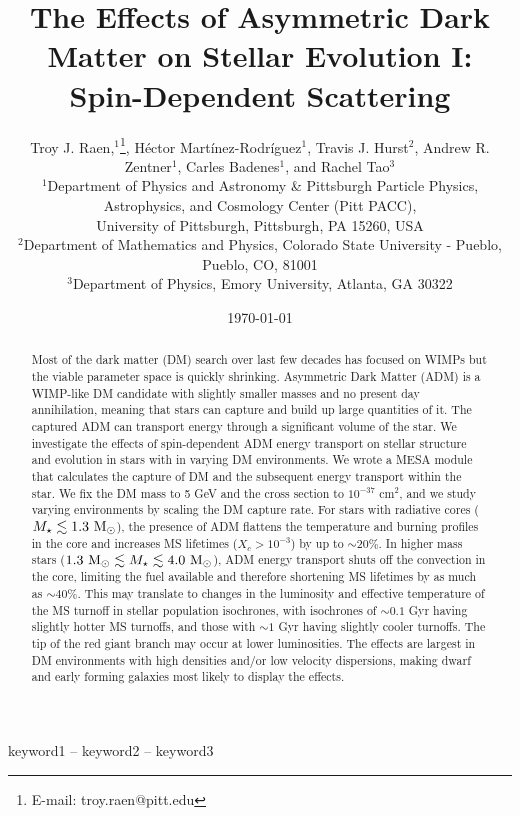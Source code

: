 \documentclass[useAMS,usenatbib]{mnras}
\title[Asymmetric Dark Matter in Stars]{The Effects of Asymmetric Dark Matter on Stellar Evolution I: Spin-Dependent Scattering}
\author[T.J. Raen et al.]{%
Troy J. Raen,$^{1}$\thanks{E-mail: troy.raen@pitt.edu},
Héctor Martínez-Rodríguez$^{1}$, 
Travis J. Hurst$^{2}$,
Andrew R. Zentner$^{1}$,\newauthor
Carles Badenes$^{1}$,
and Rachel Tao$^{3}$
\vspace*{12pt}
\\
$^{1}$Department of Physics and Astronomy \& Pittsburgh Particle Physics, Astrophysics, and Cosmology Center (Pitt PACC),\\ University of Pittsburgh, Pittsburgh, PA 15260, USA\\
$^{2}$Department of Mathematics and Physics, Colorado State University - Pueblo, Pueblo, CO, 81001 \\%
$^{3}$Department of Physics, Emory University, Atlanta, GA 30322
}
\date{\today}
\begin{document}
\label{firstpage}
\pagerange{\pageref{firstpage}--\pageref{lastpage}}
\maketitle



\begin{abstract}
Most of the dark matter (DM) search over last few decades has focused on WIMPs but the viable parameter space is quickly shrinking. Asymmetric Dark Matter (ADM) is a WIMP-like DM candidate with slightly smaller masses and no present day annihilation, meaning that stars can capture and build up large quantities of it. The captured ADM can transport energy through a significant volume of the star. We investigate the effects of spin-dependent ADM energy transport on stellar structure and evolution in stars with \mrange in varying DM environments. We wrote a MESA module\footnotemark\xspace that calculates the capture of DM and the subsequent energy transport within the star. We fix the DM mass to 5 GeV and the cross section to $10^{-37}$ cm${^2}$, and we study varying environments by scaling the DM capture rate. For stars with radiative cores ($M_{\star} \lesssim 1.3 \ \mathrm{M}_{\odot}$), the presence of ADM flattens the temperature and burning profiles in the core and increases MS lifetimes ($X_c > 10^{-3}$) by up to $\sim20\%$. In higher mass stars ($1.3 \ \mathrm{M}_{\odot} \lesssim M_{\star} \lesssim 4.0 \ \mathrm{M}_{\odot}$), ADM energy transport shuts off the convection in the core, limiting the fuel available and therefore shortening MS lifetimes by as much as $\sim 40\%$. This may translate to changes in the luminosity and effective temperature of the MS turnoff in stellar population isochrones, with isochrones of $\sim 0.1$ Gyr having slightly hotter MS turnoffs, and those with $\sim 1$ Gyr having slightly cooler turnoffs. The tip of the red giant branch may occur at lower luminosities. The effects are largest in DM environments with high densities and/or low velocity dispersions, making dwarf and early forming galaxies most likely to display the effects.
\end{abstract}


\begin{keywords}
keyword1 -- keyword2 -- keyword3
\end{keywords}
\end{document}
